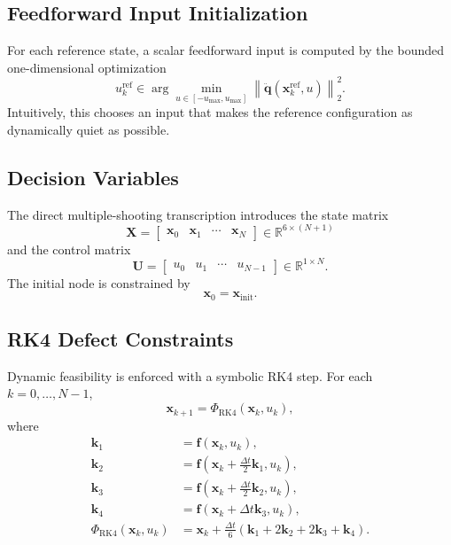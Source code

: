 \documentclass[conference]{IEEEtran}
\begin{document}
\subsection{Feedforward Input Initialization}
For each reference state, a scalar feedforward input is computed by the bounded one-dimensional optimization
\begin{equation}
u_k^{\mathrm{ref}}
\in
\arg\min_{u\in[-u_{\max},u_{\max}]}
\left\|
\ddot{\bm{q}}(\bm{x}_k^{\mathrm{ref}},u)
\right\|_2^2.
\label{eq:feedforward_guess}
\end{equation}
Intuitively, this chooses an input that makes the reference configuration as dynamically quiet as possible.

\subsection{Decision Variables}
The direct multiple-shooting transcription introduces the state matrix
\begin{equation}
\bm{X}=
\begin{bmatrix}
\bm{x}_0 & \bm{x}_1 & \cdots & \bm{x}_N
\end{bmatrix}
\in \mathbb{R}^{6\times(N+1)}
\end{equation}
and the control matrix
\begin{equation}
\bm{U}=
\begin{bmatrix}
u_0 & u_1 & \cdots & u_{N-1}
\end{bmatrix}
\in \mathbb{R}^{1\times N}.
\end{equation}
The initial node is constrained by
\begin{equation}
\bm{x}_0 = \bm{x}_{\mathrm{init}}.
\end{equation}

\subsection{RK4 Defect Constraints}
Dynamic feasibility is enforced with a symbolic RK4 step. For each $k=0,\ldots,N-1$,
\begin{equation}
\bm{x}_{k+1} = \Phi_{\mathrm{RK4}}(\bm{x}_k,u_k),
\label{eq:defect_constraint}
\end{equation}
where
\begin{align}
\bm{k}_1 &= \bm{f}(\bm{x}_k,u_k), \\
\bm{k}_2 &= \bm{f}\!\left(\bm{x}_k+\frac{\Delta t}{2}\bm{k}_1,u_k\right), \\
\bm{k}_3 &= \bm{f}\!\left(\bm{x}_k+\frac{\Delta t}{2}\bm{k}_2,u_k\right), \\
\bm{k}_4 &= \bm{f}\!\left(\bm{x}_k+\Delta t\bm{k}_3,u_k\right), \\
\Phi_{\mathrm{RK4}}(\bm{x}_k,u_k) &=
\bm{x}_k + \frac{\Delta t}{6}\left(\bm{k}_1+2\bm{k}_2+2\bm{k}_3+\bm{k}_4\right).
\end{align}
\end{document}
